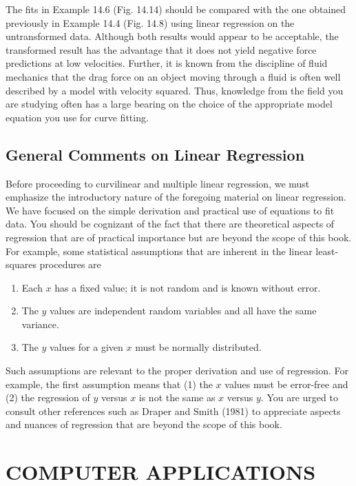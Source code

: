 \documentclass[../main.tex]{subfiles}
\begin{document}
The fits in Example 14.6 (Fig. 14.14) should be compared with the one obtained previously in Example 14.4 (Fig. 14.8) using linear regression on the untransformed data. Although both results would appear to be acceptable, the transformed result has the advantage that it does not yield negative force predictions at low velocities. Further, it is known from the discipline of fluid mechanics that the drag force on an object moving through a fluid is often well described by a model with velocity squared. Thus, knowledge from the field you are studying often has a large bearing on the choice of the appropriate model equation you use for curve fitting.


\label{cha:cha_P_14_4_1}
\subsection{General Comments on Linear Regression}

\noindent Before proceeding to curvilinear and multiple linear regression, we must emphasize the introductory nature of the foregoing material on linear regression. We have focused on the simple derivation and practical use of equations to fit data. You should be cognizant of the fact that there are theoretical aspects of regression that are of practical importance but are beyond the scope of this book. For example, some statistical assumptions that are inherent in the linear least-squares procedures are

\begin{enumerate}
	\item Each $x$ has a fixed value; it is not random and is known without error.
	\item The $y$ values are independent random variables and all have the same variance.
	\item The $y$ values for a given $x$ must be normally distributed.
\end{enumerate}

Such assumptions are relevant to the proper derivation and use of regression. For example, the first assumption means that (1) the $x$ values must be error-free and (2) the regression of $y$ versus $x$ is not the same as $x$ versus $y$. You are urged to consult other references such as Draper and Smith (1981) to appreciate aspects and nuances of regression that are beyond the scope of this book.

\label{cha:cha_P_14_5}
\section{COMPUTER APPLICATIONS}
\end{document}
